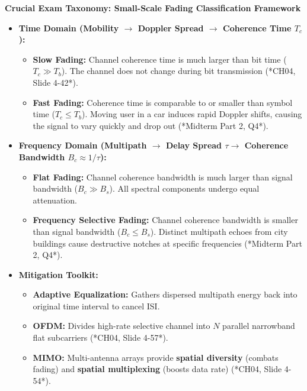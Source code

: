 \documentclass[10pt,a4paper]{article}
\begin{document}
\begin{tcolorbox}[
    colframe=accentred,
    colback=white,
    arc=1.4mm,
    boxrule=0.6pt,
    left=6pt, right=6pt, top=3pt, bottom=3pt
]
\textbf{\large\color{accentred} Crucial Exam Taxonomy: Small-Scale Fading Classification Framework}
\vspace{1pt}
\begin{itemize}[leftmargin=12pt, itemsep=2pt, topsep=1pt]
    \item \textbf{Time Domain (Mobility $\rightarrow$ Doppler Spread $\rightarrow$ Coherence Time $T_c$):}
    \begin{itemize}[leftmargin=10pt, itemsep=1pt]
        \item \textbf{Slow Fading:} Channel coherence time is much larger than bit time ($T_c \gg T_b$). The channel does not change during bit transmission (*CH04, Slide 4-42*).
        \item \textbf{Fast Fading:} Coherence time is comparable to or smaller than symbol time ($T_c \le T_b$). Moving user in a car induces rapid Doppler shifts, causing the signal to vary quickly and drop out (*Midterm Part 2, Q4*).
    \end{itemize}
    \item \textbf{Frequency Domain (Multipath $\rightarrow$ Delay Spread $\tau \rightarrow$ Coherence Bandwidth $B_c \approx 1/\tau$):}
    \begin{itemize}[leftmargin=10pt, itemsep=1pt]
        \item \textbf{Flat Fading:} Channel coherence bandwidth is much larger than signal bandwidth ($B_c \gg B_s$). All spectral components undergo equal attenuation.
        \item \textbf{Frequency Selective Fading:} Channel coherence bandwidth is smaller than signal bandwidth ($B_c \le B_s$). Distinct multipath echoes from city buildings cause destructive notches at specific frequencies (*Midterm Part 2, Q4*).
    \end{itemize}
    \item \textbf{Mitigation Toolkit:}
    \begin{itemize}[leftmargin=10pt, itemsep=1pt]
        \item \textbf{Adaptive Equalization:} Gathers dispersed multipath energy back into original time interval to cancel ISI.
        \item \textbf{OFDM:} Divides high-rate selective channel into $N$ parallel narrowband flat subcarriers (*CH04, Slide 4-57*).
        \item \textbf{MIMO:} Multi-antenna arrays provide \textbf{spatial diversity} (combats fading) and \textbf{spatial multiplexing} (boosts data rate) (*CH04, Slide 4-54*).
    \end{itemize}
\end{itemize}
\end{tcolorbox}
\end{document}
